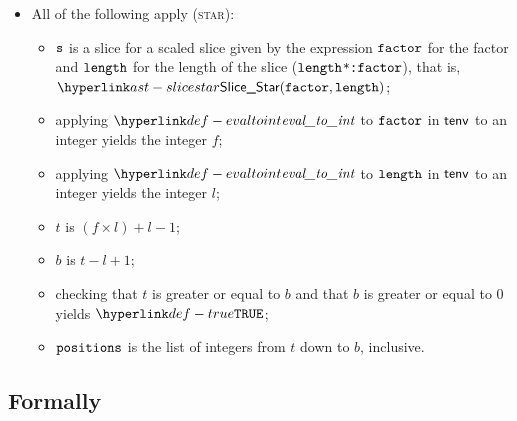 \begin{itemize}
  \item All of the following apply (\textsc{star}):
  \begin{itemize}
    \item $\texttt{s}$ is a slice for a scaled slice given by the expression $\texttt{factor}$
          for the factor and $\texttt{length}$ for the length of the slice (\texttt{$\texttt{length}$*:$\texttt{factor}$}),
          that is, \\ $\SliceStar(\efactor, \elength)$;
    \item applying $\evaltoint$ to $\texttt{factor}$ in $\textsf{tenv}$ to an integer yields the integer $f$\ProseOrTypeError;
    \item applying $\evaltoint$ to $\texttt{length}$ in $\textsf{tenv}$ to an integer yields the integer $l$\ProseOrTypeError;
    \item $t$ is $(f \times l) + l - 1$;
    \item $b$ is $t - l + 1$;
    \item checking that $t$ is greater or equal to $b$ and that $b$ is greater or equal to $0$ yields $\True$\ProseOrTypeError;
    \item $\texttt{positions}$ is the list of integers from $t$ down to $b$, inclusive.
  \end{itemize}
\end{itemize}

\subsection{Formally}

